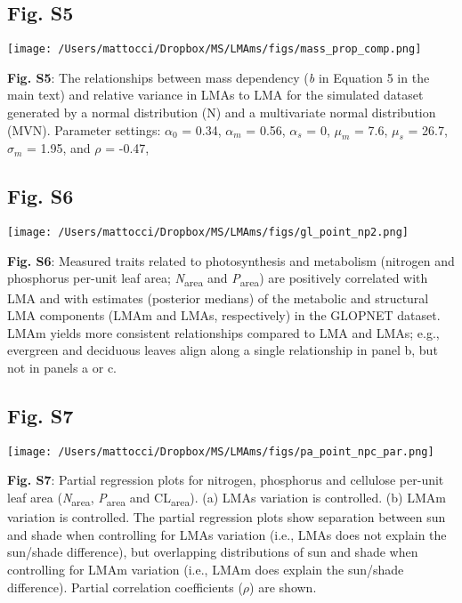 \documentclass[
  12pt,
  letterpaper,
  DIV=11,
  numbers=noendperiod]{scrartcl}
\begin{document}
\newpage

\hypertarget{fig.-s5}{%
\subsection{Fig. S5}\label{fig.-s5}}

\texttt{[image: /Users/mattocci/Dropbox/MS/LMAms/figs/mass\_prop\_comp.png]}

\textbf{Fig. S5}: The relationships between mass dependency (\emph{b} in
Equation 5 in the main text) and relative variance in LMAs to LMA for
the simulated dataset generated by a normal distribution (N) and a
multivariate normal distribution (MVN). Parameter settings: \(\alpha_0\)
= 0.34, \(\alpha_m\) = 0.56, \(\alpha_s\) = 0, \(\mu_m\) = 7.6,
\(\mu_s\) = 26.7, \(\sigma_m\) = 1.95, and \(\rho\) = -0.47,

\newpage

\hypertarget{fig.-s6}{%
\subsection{Fig. S6}\label{fig.-s6}}

\texttt{[image: /Users/mattocci/Dropbox/MS/LMAms/figs/gl\_point\_np2.png]}

\textbf{Fig. S6}: Measured traits related to photosynthesis and
metabolism (nitrogen and phosphorus per-unit leaf area;
\emph{N}\textsubscript{area} and \emph{P}\textsubscript{area}) are
positively correlated with LMA and with estimates (posterior medians) of
the metabolic and structural LMA components (LMAm and LMAs,
respectively) in the GLOPNET dataset. LMAm yields more consistent
relationships compared to LMA and LMAs; e.g., evergreen and deciduous
leaves align along a single relationship in panel b, but not in panels a
or c.

\newpage

\hypertarget{fig.-s7}{%
\subsection{Fig. S7}\label{fig.-s7}}

\texttt{[image: /Users/mattocci/Dropbox/MS/LMAms/figs/pa\_point\_npc\_par.png]}

\textbf{Fig. S7}: Partial regression plots for nitrogen, phosphorus and
cellulose per-unit leaf area (\emph{N}\textsubscript{area},
\emph{P}\textsubscript{area} and CL\textsubscript{area}). (a) LMAs
variation is controlled. (b) LMAm variation is controlled. The partial
regression plots show separation between sun and shade when controlling
for LMAs variation (i.e., LMAs does not explain the sun/shade
difference), but overlapping distributions of sun and shade when
controlling for LMAm variation (i.e., LMAm does explain the sun/shade
difference). Partial correlation coefficients (\(\rho\)) are shown.
\end{document}
